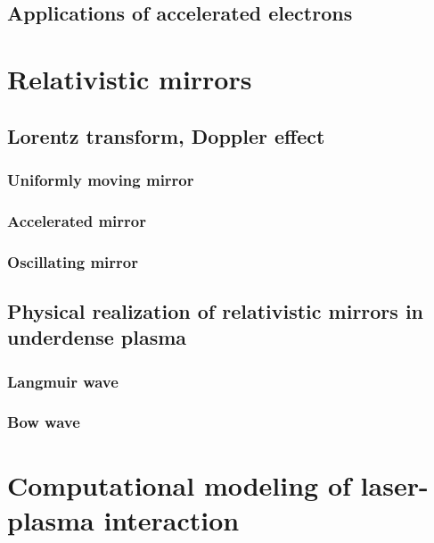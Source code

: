 \documentclass[10pt, twoside, a4paper, openright]{report}
\begin{document}
\section{Applications of accelerated electrons}
%


\chapter{Relativistic mirrors}
%

\section{Lorentz transform, Doppler effect}
%

\subsection{Uniformly moving mirror}
%

\subsection{Accelerated mirror}
%

\subsection{Oscillating mirror}
%

\section{Physical realization of relativistic mirrors in underdense plasma}
%

\subsection{Langmuir wave}
%

\subsection{Bow wave}
%


\chapter{Computational modeling of laser-plasma interaction}
%
\end{document}
